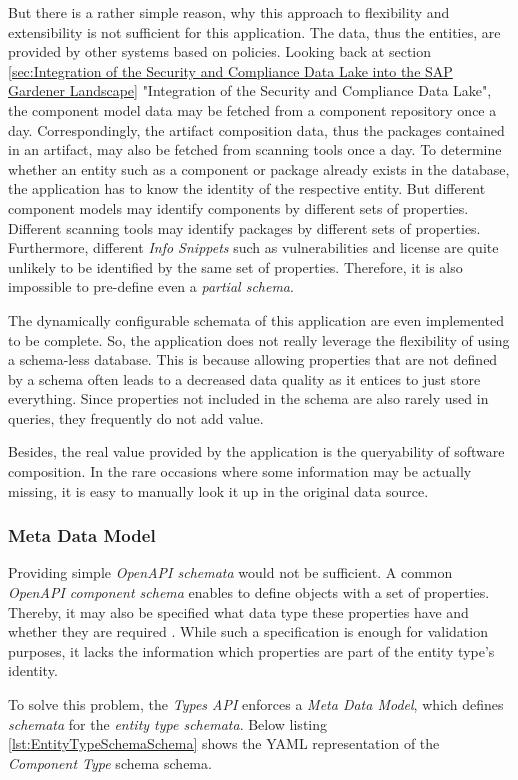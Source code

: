 But there is a rather simple reason, why this approach to flexibility and extensibility is not sufficient for this application. The data, thus the entities, are provided by other systems based on policies. Looking back at section \ref{sec:Integration of the Security and Compliance Data Lake into the SAP Gardener Landscape} "Integration of the Security and Compliance Data Lake", the component model data may be fetched from a component repository once a day. Correspondingly, the artifact composition data, thus the packages contained in an artifact, may also be fetched from scanning tools once a day. To determine whether an entity such as a component or package already exists in the database, the application has to know the identity of the respective entity. But different component models may identify components by different sets of properties. Different scanning tools may identify packages by different sets of properties. Furthermore, different \emph{Info Snippets} such as vulnerabilities and license are quite unlikely to be identified by the same set of properties. Therefore, it is also impossible to pre-define even a \emph{partial schema}.\par 
The dynamically configurable schemata of this application are even implemented to be complete. So, the application does not really leverage the flexibility of using a schema-less database. This is because allowing properties that are not defined by a schema often leads to a decreased data quality as it entices to just store everything. Since properties not included in the schema are also rarely used in queries, they frequently do not add value.\par 
Besides, the real value provided by the application is the queryability of software composition. In the rare occasions where some information may be actually missing, it is easy to manually look it up in the original data source.

\subsubsection{Meta Data Model}
Providing simple \emph{OpenAPI schemata} would not be sufficient. A common \emph{OpenAPI component schema} enables to define objects with a set of properties. Thereby, it may also be specified what data type these properties have and whether they are required \cite{OpenAPISpec}. While such a specification is enough for validation purposes, it lacks the information which properties are part of the entity type's identity.\par 
To solve this problem, the \emph{Types API} enforces a \emph{Meta Data Model}, which defines \emph{schemata} for the \emph{entity type schemata}. Below listing \ref{lst:EntityTypeSchemaSchema} shows the YAML representation of the \emph{Component Type} schema schema.

